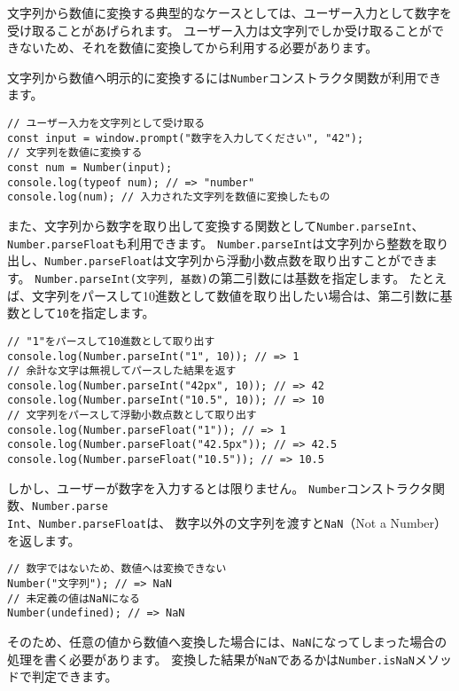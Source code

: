 文字列から数値に変換する典型的なケースとしては、ユーザー入力として数字を受け取ることがあげられます。
ユーザー入力は文字列でしか受け取ることができないため、それを数値に変換してから利用する必要があります。

文字列から数値へ明示的に変換するには\texttt{Number}コンストラクタ関数が利用できます。

\begin{lstlisting}
// ユーザー入力を文字列として受け取る
const input = window.prompt("数字を入力してください", "42");
// 文字列を数値に変換する
const num = Number(input);
console.log(typeof num); // => "number"
console.log(num); // 入力された文字列を数値に変換したもの
\end{lstlisting}

また、文字列から数字を取り出して変換する関数として\texttt{Number.parseInt}、\texttt{Number.parseFloat}も利用できます。
\texttt{Number.parseInt}は文字列から整数を取り出し、\texttt{Number.parseFloat}は文字列から浮動小数点数を取り出すことができます。
\texttt{Number.parseInt(文字列, 基数)}の第二引数には基数を指定します。
たとえば、文字列をパースして10進数として数値を取り出したい場合は、第二引数に基数として\texttt{10}を指定します。

\begin{lstlisting}
// "1"をパースして10進数として取り出す
console.log(Number.parseInt("1", 10)); // => 1
// 余計な文字は無視してパースした結果を返す
console.log(Number.parseInt("42px", 10)); // => 42
console.log(Number.parseInt("10.5", 10)); // => 10
// 文字列をパースして浮動小数点数として取り出す
console.log(Number.parseFloat("1")); // => 1
console.log(Number.parseFloat("42.5px")); // => 42.5
console.log(Number.parseFloat("10.5")); // => 10.5
\end{lstlisting}

しかし、ユーザーが数字を入力するとは限りません。
\texttt{Number}コンストラクタ関数、\texttt{Number.parse\\Int}、\texttt{Number.parseFloat}は、
数字以外の文字列を渡すと\texttt{NaN}（Not a
Number）を返します。

\begin{lstlisting}
// 数字ではないため、数値へは変換できない
Number("文字列"); // => NaN
// 未定義の値はNaNになる
Number(undefined); // => NaN
\end{lstlisting}

そのため、任意の値から数値へ変換した場合には、\texttt{NaN}になってしまった場合の処理を書く必要があります。
変換した結果が\texttt{NaN}であるかは\texttt{Number.isNaN}メソッドで判定できます。

